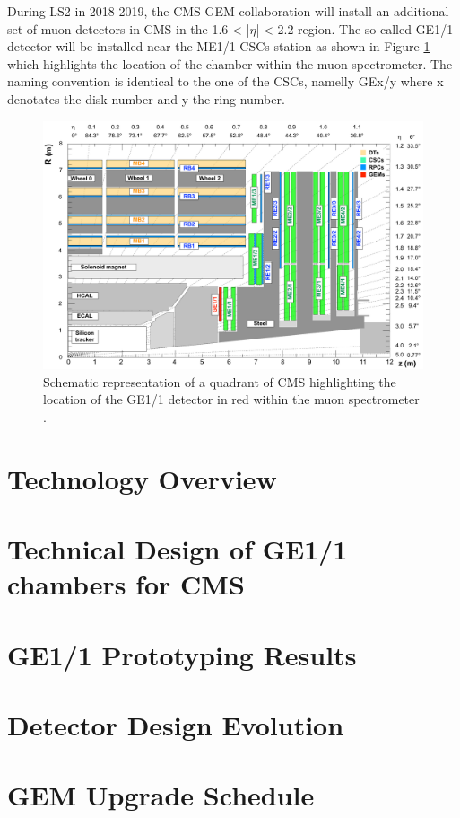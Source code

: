     During LS2 in 2018-2019, the CMS GEM collaboration \cite{Colaleo:2021453} will install an additional set of muon detectors in CMS in the 1.6 < |$\eta$| < 2.2 region. The so-called GE1/1 detector will be installed near the ME1/1 CSCs station as shown in Figure \ref{fig:II-1-gem-ge11} which highlights the location of the chamber within the muon spectrometer. The naming convention is identical to the one of the CSCs, namelly GEx/y where x denotates the disk number and y the ring number. \\

    \begin{figure}[h!]
      \centering
      \includegraphics[width=\textwidth]{img/II-1-gem/ge11-quadrant.pdf}
      \caption{Schematic representation of a quadrant of CMS highlighting the location of the GE1/1 detector in red within the muon spectrometer \cite{Colaleo:2021453}.}
      \label{fig:II-1-gem-ge11}
    \end{figure}

  \section{Technology Overview}

  \section{Technical Design of GE1/1 chambers for CMS}

  \section{GE1/1 Prototyping Results}

  \section{Detector Design Evolution}

  \section{GEM Upgrade Schedule}
